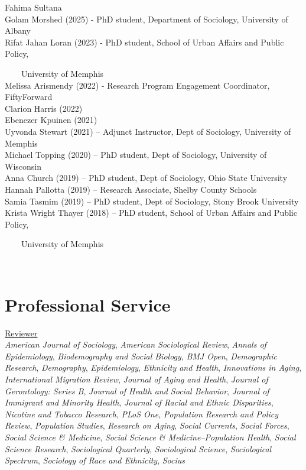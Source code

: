 \documentclass[11pt,]{article}
\begin{document}
Fahima Sultana\\
Golam Morshed (2025) - PhD student, Department of Sociology, University
of Albany\\
Rifat Jahan Loran (2023) - PhD student, School of Urban Affairs and
Public Policy,\\
\strut ~~~~University of Memphis\\
Melissa Arismendy (2022) - Research Program Engagement Coordinator,
FiftyForward\\
Clarion Harris (2022)\\
Ebenezer Kpuinen (2021)\\
Uyvonda Stewart (2021) -- Adjunct Instructor, Dept of Sociology,
University of Memphis\\
Michael Topping (2020) -- PhD student, Dept of Sociology, University of
Wisconsin\\
Anna Church (2019) -- PhD student, Dept of Sociology, Ohio State
University\\
Hannah Pallotta (2019) -- Research Associate, Shelby County Schools\\
Samia Tasmim (2019) -- PhD student, Dept of Sociology, Stony Brook
University\\
Krista Wright Thayer (2018) -- PhD student, School of Urban Affairs and
Public Policy,\\
\strut ~~~~University of Memphis

\setlength{\leftskip}{0cm}

~

\section{Professional Service}\label{professional-service}

\underline{Reviewer}\\
\emph{American Journal of Sociology}, \emph{American Sociological
Review}, \emph{Annals of Epidemiology}, \emph{Biodemography and Social
Biology}, \emph{BMJ Open}, \emph{Demographic Research},
\emph{Demography}, \emph{Epidemiology}, \emph{Ethnicity and Health},
\emph{Innovations in Aging}, \emph{International Migration Review},
\emph{Journal of Aging and Health}, \emph{Journal of Gerontology: Series
B}, \emph{Journal of Health and Social Behavior}, \emph{Journal of
Immigrant and Minority Health}, \emph{Journal of Racial and Ethnic
Disparities}, \emph{Nicotine and Tobacco Research}, \emph{PLoS One},
\emph{Population Research and Policy Review}, \emph{Population Studies},
\emph{Research on Aging}, \emph{Social Currents}, \emph{Social Forces},
\emph{Social Science \& Medicine}, \emph{Social Science \&
Medicine--Population Health}, \emph{Social Science Research},
\emph{Sociological Quarterly}, \emph{Sociological Science},
\emph{Sociological Spectrum}, \emph{Sociology of Race and Ethnicity},
\emph{Socius}
\end{document}
